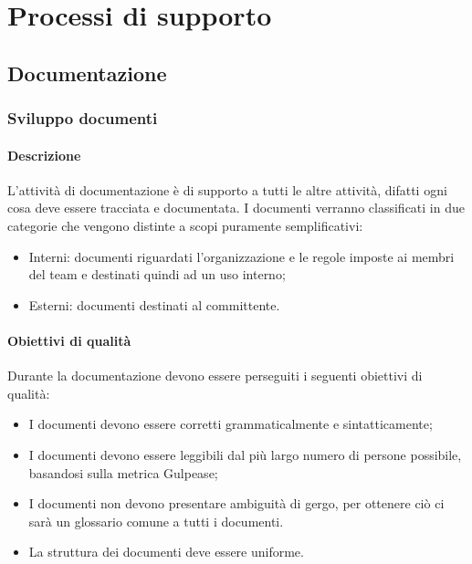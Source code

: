 \documentclass[../NormeDiProgetto_v3.0.0.tex]{subfiles}
\begin{document}
\section{Processi di supporto}
	\subsection{Documentazione}
		\subsubsection{Sviluppo documenti}
			\paragraph{Descrizione}
				L'attività di documentazione è di supporto a tutti le altre attività, difatti ogni cosa deve essere tracciata e documentata.
				I documenti verranno classificati in due categorie che vengono distinte a scopi puramente semplificativi:
				\begin{itemize}
					\item Interni: documenti riguardati l'organizzazione e le regole imposte ai membri del team e destinati quindi ad un uso interno;
					\item Esterni: documenti destinati al committente.
				\end{itemize}

			\paragraph{Obiettivi di qualità}
				Durante la documentazione devono essere perseguiti i seguenti obiettivi di qualità:
				\begin{itemize}
					\item I documenti devono essere corretti grammaticalmente e sintatticamente;
					\item I documenti devono essere leggibili dal più largo numero di persone possibile, basandosi sulla metrica Gulpease;
					\item I documenti non devono presentare ambiguità di gergo, per ottenere ciò ci sarà un glossario comune a tutti i documenti.
					\item La struttura dei documenti deve essere uniforme.
				\end{itemize}
\end{document}
